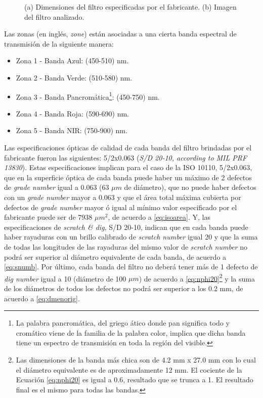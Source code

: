\begin{figure}
\caption{(a) Dimensiones del filtro especificadas por el fabricante. (b) Imagen del filtro analizado.}
\label{fig:dimspost}
\end{figure}

Las zonas (en inglés, \textit{zone}) están asociadas a una cierta banda espectral de transmisión de la siguiente manera:
\begin{itemize}
\justifying
\item Zona 1 - Banda Azul: (450-510) nm.
\item Zona 2 - Banda Verde: (510-580) nm.
\item Zona 3 - Banda Pancromática\footnote{La palabra pancromática, del griego ático donde pan significa todo y cromático viene de la familia de la palabra color, implica que dicha banda tiene un espectro de transmisión en toda la región del visible.}: (450-750) nm.
\item Zona 4 - Banda Roja: (590-690) nm.
\item Zona 5 - Banda NIR: (750-900) nm.
\end{itemize}
 \hspace{0.5cm}Las especificaciones ópticas de calidad de cada banda del filtro brindadas por el fabricante fueron las siguientes: 5/2x0.063 (\textit{S/D 20-10, according to MIL PRF 13830}). Estas especificaciones implican para el caso de la ISO 10110, 5/2x0.063, que en la superficie óptica de cada banda puede haber un máximo de 2 defectos de \textit{grade number} igual a 0.063 (63 $\mu m$ de diámetro), que no puede haber defectos con un \textit{grade number} mayor a 0.063 y que el área total máxima cubierta por defectos de \textit{grade number} mayor ó igual al mínimo valor especificado por el fabricante puede ser de 7938 $\mu m^{2}$, de acuerdo a \ref{eq:isoarea}. Y, las especificaciones de \textit{scratch \& dig}, S/D 20-10, indican que en cada banda puede haber rayaduras con un brillo calibrado de \textit{scratch number} igual 20 y que la suma de todas las longitudes de las rayaduras del mismo valor de \textit{scratch number} no podrá ser superior al diámetro equivalente de cada banda, de acuerdo a \ref{eq:snumb}. Por último, cada banda del filtro no deberá tener más de 1 defecto de \textit{dig number} igual a 10 (diámetro de 100 $\mu m$)  de acuerdo a \ref{eq:nphi20}\footnote{Las dimensiones de la banda más chica son de 4.2 mm x 27.0 mm con lo cual el diámetro equivalente es de aproximadamente 12 mm. El cociente de la Ecuación \ref{eq:nphi20} es igual a 0.6, resultado que se trunca a 1. El resultado final es el mismo para todas las bandas.}  y la suma de los diámetros de todos los defectos no podrá ser superior a los 0.2 mm, de acuerdo a \ref{eq:dmenorig}. 

